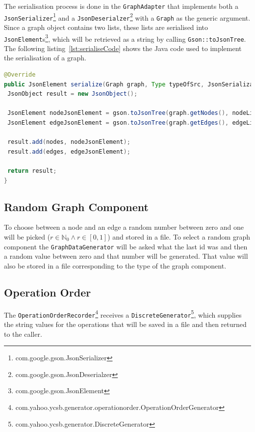 The serialisation process is done in the \texttt{GraphAdapter} that implements both a \texttt{JsonSerializer}\footnote{com.google.gson.JsonSerializer} and a \texttt{JsonDeserialzer}\footnote{com.google.gson.JsonDeserialzer} with a \texttt{Graph} as the generic argument.
Since a graph object contains two lists,
these lists are serialised into \texttt{JsonElement}s\footnote{com.google.gson.JsonElement},
which will be retrieved as a string by calling \texttt{Gson::toJsonTree}.
The following listing~\ref{lst:serialiseCode} shows the Java code used to implement the serialisation of a graph.

\begin{lstlisting}[language=Java,label={lst:serialiseCode},caption={Serialisation of a \texttt{Graph} object.},captionpos=b]
@Override
public JsonElement serialize(Graph graph, Type typeOfSrc, JsonSerializationContext context) {
 JsonObject result = new JsonObject();

 JsonElement nodeJsonElement = gson.toJsonTree(graph.getNodes(), nodeListType);
 JsonElement edgeJsonElement = gson.toJsonTree(graph.getEdges(), edgeListType);

 result.add(nodes, nodeJsonElement);
 result.add(edges, edgeJsonElement);

 return result;
}
\end{lstlisting}

\subsection{Random Graph Component}
To choose between a node and an edge a random number between zero and one will be picked ($ r \in \mathbb{N}_0 \wedge r \in [ 0, 1 ] $) and stored in a file.
To select a random graph component the \texttt{GraphDataGenerator} will be asked what the last id was and then a random value between zero and that number will be generated.
That value will also be stored in a file corresponding to the type of the graph component.

\subsection{Operation Order}
\label{ch:implementation:se:operationOrderRecorder}
The \texttt{OperationOrderRecorder}\footnote{com.yahoo.ycsb.generator.operationorder.OperationOrderGenerator} receives a \texttt{DiscreteGenerator}\footnote{com.yahoo.ycsb.generator.DiscreteGenerator},
which supplies the string values for the operations that will be saved in a file and then returned to the caller.

